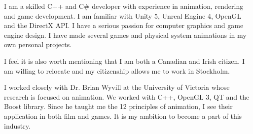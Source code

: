 I am a skilled C++ and C\# developer with experience in animation, rendering and game development.
I am familiar with Unity 5, Unreal Engine 4, OpenGL and the DirectX API.
I have a serious passion for computer graphics and game engine design.
I have made several games and physical system animations in my own personal projects. 

I feel it is also worth mentioning that I am both a Canadian and Irish citizen. 
I am willing to relocate and my citizenship allows me to work in Stockholm. 


I worked closely with Dr. Brian Wyvill at the University of Victoria whose research is focused on animation.
We worked with C++, OpenGL 3, QT and the Boost library.
Since he taught me the 12 principles of animation, I see their application in both film and games.
It is my ambition to become a part of this industry. 

